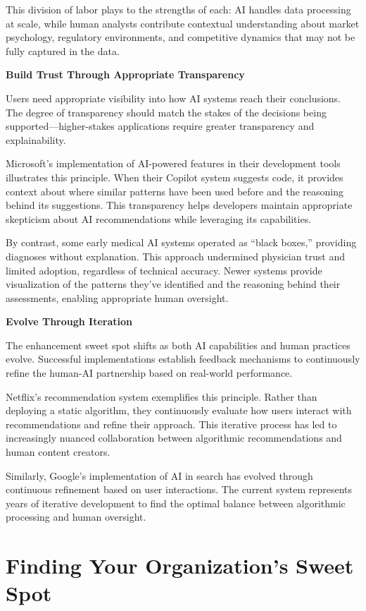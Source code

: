 \documentclass[
  Letterpaper,
]{scrbook}
\begin{document}
This division of labor plays to the strengths of each: AI handles data
processing at scale, while human analysts contribute contextual
understanding about market psychology, regulatory environments, and
competitive dynamics that may not be fully captured in the data.

\textbf{Build Trust Through Appropriate Transparency}

Users need appropriate visibility into how AI systems reach their
conclusions. The degree of transparency should match the stakes of the
decisions being supported---higher-stakes applications require greater
transparency and explainability.

Microsoft's implementation of AI-powered features in their development
tools illustrates this principle. When their Copilot system suggests
code, it provides context about where similar patterns have been used
before and the reasoning behind its suggestions. This transparency helps
developers maintain appropriate skepticism about AI recommendations
while leveraging its capabilities.

By contrast, some early medical AI systems operated as ``black boxes,''
providing diagnoses without explanation. This approach undermined
physician trust and limited adoption, regardless of technical accuracy.
Newer systems provide visualization of the patterns they've identified
and the reasoning behind their assessments, enabling appropriate human
oversight.

\textbf{Evolve Through Iteration}

The enhancement sweet spot shifts as both AI capabilities and human
practices evolve. Successful implementations establish feedback
mechanisms to continuously refine the human-AI partnership based on
real-world performance.

Netflix's recommendation system exemplifies this principle. Rather than
deploying a static algorithm, they continuously evaluate how users
interact with recommendations and refine their approach. This iterative
process has led to increasingly nuanced collaboration between
algorithmic recommendations and human content creators.

Similarly, Google's implementation of AI in search has evolved through
continuous refinement based on user interactions. The current system
represents years of iterative development to find the optimal balance
between algorithmic processing and human oversight.

\section{Finding Your Organization's Sweet
Spot}\label{finding-your-organizations-sweet-spot}
\end{document}
